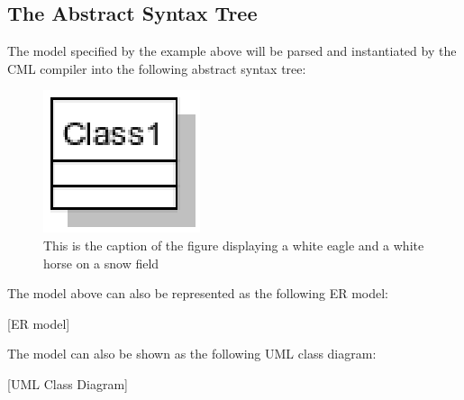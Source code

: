 \subsection{The Abstract Syntax Tree}\label{subsec:ast}

The model specified by the example above will be parsed and instantiated by the CML compiler into the following abstract syntax tree:

\label{fig:ast}
\begin{figure}
\centering
\includegraphics{language/main}
\caption{This is the caption of the figure displaying a white eagle and
a white horse on a snow field}
\end{figure}

The model above can also be represented as the following ER model:

[ER model]

The model can also be shown as the following UML class diagram:

[UML Class Diagram]
